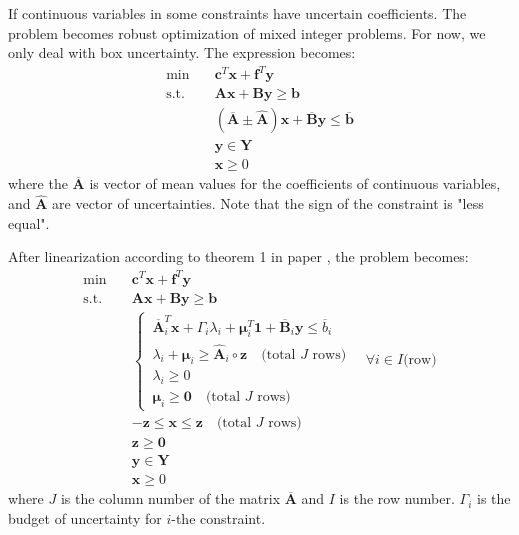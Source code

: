 \documentclass[fleqn,10pt]{wlscirep}
\begin{document}
If continuous variables in some constraints have uncertain coefficients. The problem becomes robust optimization of mixed integer problems. For now, we only deal with box uncertainty. The expression becomes:
\begin{align}
    \min \quad& \mathbf{c}^{T} \mathbf{x} + \mathbf{f}^{T} \mathbf{y} \label{eq:5} \\
    \text{s.t.} \quad& \mathbf{A} \mathbf{x} + \mathbf{B} \mathbf{y} \geq \mathbf{b} \label{eq:6} \\ 
    & \left(\overline{\mathbf{A}} \pm \hat{\mathbf{A}} \right) \mathbf{x} + \overline{\mathbf{B}} \mathbf{y} \leq \overline{\mathbf{b}} \label{eq:7} \\
    & \mathbf{y} \in \mathbf{Y} \label{eq:8} \\ 
    & \mathbf{x} \geq 0 \label{eq:9}
\end{align}
where the $\overline{\mathbf{A}}$ is vector of mean values for the coefficients of continuous variables, and $\hat{\mathbf{A}} $ are vector of uncertainties. Note that the sign of the constraint is "less equal". 

After linearization according to theorem 1 in paper \cite{bertsimas2004price}, the problem becomes:
\begin{align}
    \min \quad& \mathbf{c}^{T} \mathbf{x} + \mathbf{f}^{T} \mathbf{y} \label{eq:10} \\
    \text{s.t.} \quad& \mathbf{A} \mathbf{x} + \mathbf{B} \mathbf{y} \geq \mathbf{b} \label{eq:11} \\ 
    & \begin{cases}
        \, \overline{\mathbf{A}}_{i}^{T} \mathbf{x} + \Gamma_{i} \lambda_{i} + \boldsymbol{\mu}_{i}^{T} \mathbf{1} + \overline{\mathbf{B}}_{i} \mathbf{y} \leq \overline{b}_{i} \\
        \, \lambda_{i} + \boldsymbol{\mu}_{i} \geq \hat{\mathbf{A}}_{i} \circ \mathbf{z} \quad \text{(total $J$ rows)} \\
        \, \lambda_{i} \geq 0 \\
        \, \boldsymbol{\mu}_{i} \geq \mathbf{0} \quad \text{(total $J$ rows)}
    \end{cases} \quad \forall i \in I \text{(row)} \label{eq:12} \\
    & - \mathbf{z} \leq \mathbf{x} \leq \mathbf{z} \quad \text{(total $J$ rows)} \\
    & \mathbf{z} \geq \mathbf{0} \\
    & \mathbf{y} \in \mathbf{Y} \label{eq:13} \\ 
    & \mathbf{x} \geq 0 \label{eq:14}
\end{align}
where $J$ is the column number of the matrix $\overline{\mathbf{A}}$ and $I$ is the row number. $\Gamma_{i}$ is the budget of uncertainty for $i$-the constraint. 
\end{document}
